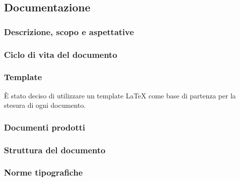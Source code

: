 \subsection{Documentazione}

\subsubsection{Descrizione, scopo e aspettative}

\subsubsection{Ciclo di vita del documento}

\subsubsection{Template}
È stato deciso di utilizzare un template LaTeX %
come base di partenza per la stesura di ogni documento.

\subsubsection{Documenti prodotti}



\subsubsection{Struttura del documento}






\subsubsection{Norme tipografiche}



